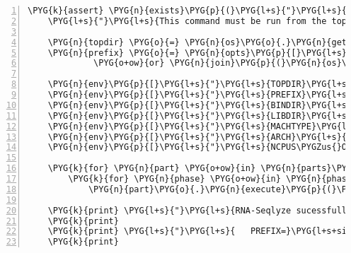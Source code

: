 \begin{Verbatim}[commandchars=\\\{\},numbers=left,firstnumber=1,stepnumber=5]
    \PYG{k}{assert} \PYG{n}{exists}\PYG{p}{(}\PYG{l+s}{"}\PYG{l+s}{src/rna-seqlyze/rnaseqlyze/\PYGZus{}\PYGZus{}init\PYGZus{}\PYGZus{}.py}\PYG{l+s}{"}\PYG{p}{)}\PYG{p}{,} \PYGZbs{}
    \PYG{l+s}{"}\PYG{l+s}{This command must be run from the top level RNA-Seqlyze source directory!}\PYG{l+s}{"}

    \PYG{n}{topdir} \PYG{o}{=} \PYG{n}{os}\PYG{o}{.}\PYG{n}{getcwd}\PYG{p}{(}\PYG{p}{)}
    \PYG{n}{prefix} \PYG{o}{=} \PYG{n}{opts}\PYG{p}{[}\PYG{l+s}{'}\PYG{l+s}{--prefix}\PYG{l+s}{'}\PYG{p}{]} \PYGZbs{}
             \PYG{o+ow}{or} \PYG{n}{join}\PYG{p}{(}\PYG{n}{os}\PYG{o}{.}\PYG{n}{getenv}\PYG{p}{(}\PYG{l+s}{"}\PYG{l+s}{HOME}\PYG{l+s}{"}\PYG{p}{)}\PYG{p}{,} \PYG{l+s}{"}\PYG{l+s}{.local}\PYG{l+s}{"}\PYG{p}{)}

    \PYG{n}{env}\PYG{p}{[}\PYG{l+s}{"}\PYG{l+s}{TOPDIR}\PYG{l+s}{"}\PYG{p}{]} \PYG{o}{=} \PYG{n}{topdir}
    \PYG{n}{env}\PYG{p}{[}\PYG{l+s}{"}\PYG{l+s}{PREFIX}\PYG{l+s}{"}\PYG{p}{]} \PYG{o}{=} \PYG{n}{prefix}
    \PYG{n}{env}\PYG{p}{[}\PYG{l+s}{"}\PYG{l+s}{BINDIR}\PYG{l+s}{"}\PYG{p}{]} \PYG{o}{=} \PYG{n}{prefix} \PYG{o}{+} \PYG{l+s}{"}\PYG{l+s}{/bin}\PYG{l+s}{"}
    \PYG{n}{env}\PYG{p}{[}\PYG{l+s}{"}\PYG{l+s}{LIBDIR}\PYG{l+s}{"}\PYG{p}{]} \PYG{o}{=} \PYG{n}{prefix} \PYG{o}{+} \PYG{l+s}{"}\PYG{l+s}{/lib}\PYG{l+s}{"}
    \PYG{n}{env}\PYG{p}{[}\PYG{l+s}{"}\PYG{l+s}{MACHTYPE}\PYG{l+s}{"}\PYG{p}{]} \PYG{o}{=} \PYG{n}{os}\PYG{o}{.}\PYG{n}{uname}\PYG{p}{(}\PYG{p}{)}\PYG{p}{[}\PYG{l+m+mi}{4}\PYG{p}{]}
    \PYG{n}{env}\PYG{p}{[}\PYG{l+s}{"}\PYG{l+s}{ARCH}\PYG{l+s}{"}\PYG{p}{]} \PYG{o}{=} \PYG{n}{re}\PYG{o}{.}\PYG{n}{sub}\PYG{p}{(}\PYG{l+s}{'}\PYG{l+s}{i.86}\PYG{l+s}{'}\PYG{p}{,} \PYG{l+s}{'}\PYG{l+s}{i386}\PYG{l+s}{'}\PYG{p}{,} \PYG{n}{env}\PYG{p}{[}\PYG{l+s}{"}\PYG{l+s}{MACHTYPE}\PYG{l+s}{"}\PYG{p}{]}\PYG{p}{)}
    \PYG{n}{env}\PYG{p}{[}\PYG{l+s}{"}\PYG{l+s}{NCPUS\PYGZus{}ONLN}\PYG{l+s}{"}\PYG{p}{]} \PYG{o}{=} \PYG{n+nb}{str}\PYG{p}{(}\PYG{n}{os}\PYG{o}{.}\PYG{n}{sysconf}\PYG{p}{(}\PYG{l+s}{"}\PYG{l+s}{SC\PYGZus{}NPROCESSORS\PYGZus{}ONLN}\PYG{l+s}{"}\PYG{p}{)}\PYG{p}{)}

    \PYG{k}{for} \PYG{n}{part} \PYG{o+ow}{in} \PYG{n}{parts}\PYG{p}{:}
        \PYG{k}{for} \PYG{n}{phase} \PYG{o+ow}{in} \PYG{n}{phases}\PYG{p}{:}
            \PYG{n}{part}\PYG{o}{.}\PYG{n}{execute}\PYG{p}{(}\PYG{n}{phase}\PYG{p}{)}

    \PYG{k}{print} \PYG{l+s}{"}\PYG{l+s}{RNA-Seqlyze sucessfully installed.}\PYG{l+s}{"}
    \PYG{k}{print}
    \PYG{k}{print} \PYG{l+s}{"}\PYG{l+s}{   PREFIX=}\PYG{l+s+si}{\PYGZpc{}s}\PYG{l+s}{"} \PYG{o}{\PYGZpc{}} \PYG{n}{prefix}
    \PYG{k}{print}
\end{Verbatim}


